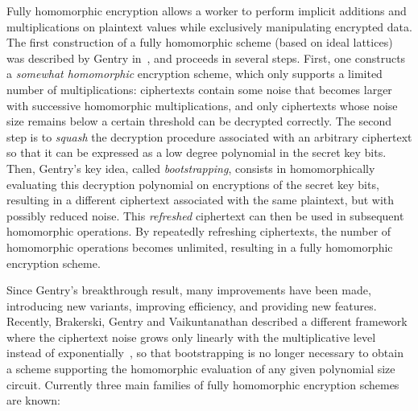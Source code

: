 \documentclass[11pt]{llncs}
\begin{document}
Fully homomorphic encryption allows a worker to perform implicit
additions and multiplications on plaintext values while exclusively
manipulating encrypted data. The first construction of a fully
homomorphic scheme (based on ideal lattices) was described by Gentry
in~\cite{GenPhD}, and proceeds in several steps. First, one constructs a
\emph{somewhat homomorphic} encryption scheme, which only supports a limited
number of multiplications: ciphertexts contain some noise that becomes
larger with successive homomorphic multiplications, and only ciphertexts
whose noise size remains below a certain threshold can be decrypted
correctly. The second step is to \emph{squash} the decryption procedure
associated with an arbitrary ciphertext so that it can be expressed as a
low degree polynomial in the secret key bits. Then, Gentry's key
idea, called \emph{bootstrapping}, consists in homomorphically evaluating
this decryption polynomial on encryptions of the secret key bits,
resulting in a different ciphertext associated with the same plaintext,
but with possibly reduced noise. This \emph{refreshed} ciphertext can then
be used in subsequent homomorphic operations. By repeatedly refreshing
ciphertexts, the number of homomorphic operations becomes unlimited,
resulting in a fully homomorphic encryption scheme.

Since Gentry's breakthrough result, many improvements have been made,
introducing new variants, improving efficiency, and providing new
features. Recently, Brakerski, Gentry and Vaikuntanathan described a
different framework where the ciphertext noise grows only linearly with
the multiplicative level instead of exponentially~\cite{BGV2012}, so that
bootstrapping is no longer necessary to obtain a scheme supporting the
homomorphic evaluation of any given polynomial size circuit. Currently
three main families of fully homomorphic encryption schemes are known:
\end{document}
